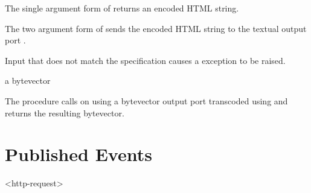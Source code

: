 The single argument form of  returns an encoded
HTML string.

The two argument form of  sends the encoded HTML
string to the textual output port .

Input that does not match the specification causes a
 exception to be raised.

\begin{procedure}
\end{procedure}
\returns{} a bytevector

The  procedure calls  on
 using a bytevector output port transcoded using
 and returns the resulting bytevector.

\section {Published Events}

\begin{pubevent}{<http-request>}
\end{pubevent}
